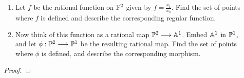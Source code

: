 \label{1.4.3}

\begin{enumerate}[label = (\alph*)]
    \item Let $f$ be the rational function on $\P^2$ given by $f = \frac{x_1}{x_0}$. Find the set of points where $f$ is defined and describe the corresponding regular function.

    \item Now think of this function as a rational map $\P^2 \longrightarrow \A^1$. Embed $\A^1$ in $\P^1$, and let $\phi: \P^2 \longrightarrow \P^1$ be the resulting rational map. Find the set of points where $\phi$ is defined, and describe the corresponding morphism.
\end{enumerate}

\begin{proof}

\end{proof}
